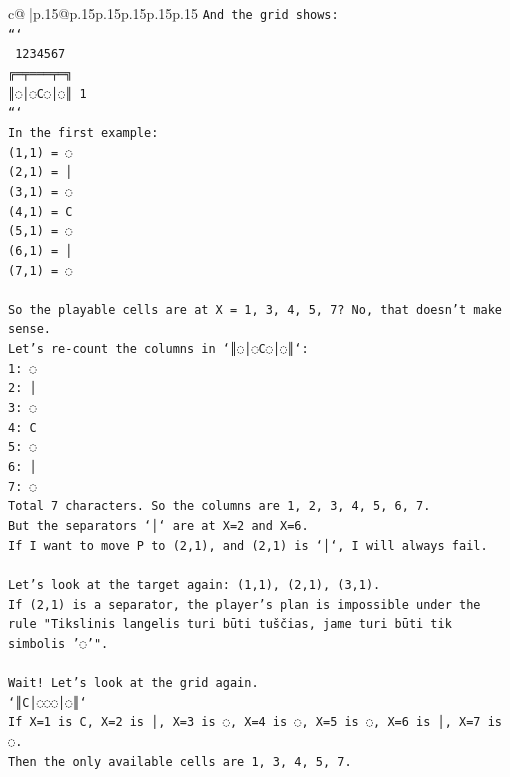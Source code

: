 \documentclass{article}
\begin{document}
{\begin{supertabular}{c@{$\;$}|p{.15\linewidth}@{}p{.15\linewidth}p{.15\linewidth}p{.15\linewidth}p{.15\linewidth}p{.15\linewidth}}
{{{\texttt{And the grid shows:} \\
\texttt{```} \\
\texttt{ 1234567} \\
\texttt{╔═╤═══╤═╗} \\
\texttt{║◌│◌C◌│◌║ 1} \\
\texttt{```} \\
\texttt{In the first example:} \\
\texttt{(1,1) = ◌} \\
\texttt{(2,1) = │} \\
\texttt{(3,1) = ◌} \\
\texttt{(4,1) = C} \\
\texttt{(5,1) = ◌} \\
\texttt{(6,1) = │} \\
\texttt{(7,1) = ◌} \\
\\ 
\texttt{So the playable cells are at X = 1, 3, 4, 5, 7? No, that doesn't make sense.} \\
\texttt{Let's re{-}count the columns in `║◌│◌C◌│◌║`:} \\
\texttt{1: ◌} \\
\texttt{2: │} \\
\texttt{3: ◌} \\
\texttt{4: C} \\
\texttt{5: ◌} \\
\texttt{6: │} \\
\texttt{7: ◌} \\
\texttt{Total 7 characters. So the columns are 1, 2, 3, 4, 5, 6, 7.} \\
\texttt{But the separators `│` are at X=2 and X=6.} \\
\texttt{If I want to move P to (2,1), and (2,1) is `│`, I will always fail.} \\
\\ 
\texttt{Let's look at the target again: (1,1), (2,1), (3,1).} \\
\texttt{If (2,1) is a separator, the player's plan is impossible under the rule "Tikslinis langelis turi būti tuščias, jame turi būti tik simbolis '◌'".} \\
\\ 
\texttt{Wait! Let's look at the grid again.} \\
\texttt{`║C│◌◌◌│◌║`} \\
\texttt{If X=1 is C, X=2 is │, X=3 is ◌, X=4 is ◌, X=5 is ◌, X=6 is │, X=7 is ◌.} \\
\texttt{Then the only available cells are 1, 3, 4, 5, 7.} \\
}}}
\end{supertabular}}
\end{document}
